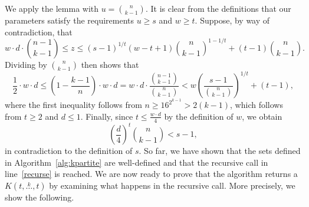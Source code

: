 \documentclass{amsart}
\newcommand{\compoverset}[2]{\ensuremath{K(#2, \overset{#1}{\dots}, #2)}}
\begin{document}
We apply the lemma with $u = \binom{n}{k-1}$.
It is clear from the definitions that our parameters satisfy the requirements $u \geq s$ and $w \geq t$.
Suppose, by way of contradiction, that
\[
    w \cdot d \cdot \binom{n - 1}{k-1} \leq z \leq (s - 1)^{1 / t}(w - t + 1)\binom{n}{k-1}^{1 - 1 / t} + (t - 1)\binom{n}{k-1}.
\]
Dividing by $\binom{n}{k-1}$ then shows that
\[
    \frac{1}{2} \cdot w \cdot d
    \leq \left( 1 - \frac{k-1}{n}\right) \cdot w \cdot d
    = w \cdot d \cdot \frac{\binom{n-1}{k-1}}{\binom{n}{k-1}}
    < w \left( \frac{s-1}{\binom{n}{k-1} }\right)^{1 / t} + (t - 1),
\]
where the first inequality follows from $n \geq 16^{2^{k-1}} > 2(k-1)$, which follows from $t \geq 2$ and $d \leq 1$.
Finally, since $t \leq \frac{w \cdot d}{4}$ by the definition of $w$, we obtain
\[
    \left( \frac{d}{4}\right)^t \binom{n}{k-1} < s-1,
\]
in contradiction to the definition of $s$.
So far, we have shown that the sets defined in Algorithm~\ref{alg:kpartite}
are well-defined and that the recursive call in line~\ref{recurse} is reached.
We are now ready to prove that the algorithm returns a $\compoverset{k}{t}$
by examining what happens in the recursive call.
More precisely, we show the following.
\end{document}
